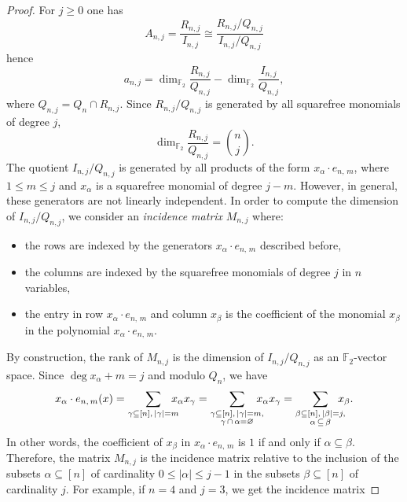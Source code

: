 \documentclass[11pt]{article}
\newcommand{\F}[0]{\mathbb{F}}
\newcommand{\es}[2]{e_{#1,\, #2}}
\theoremstyle{plain}
\theoremstyle{definition}
\theoremstyle{remark}
\begin{document}
\begin{proof}
For $j\geq 0$ one has
$$A_{n,j}=\frac{R_{n,j}}{I_{n,j}}\cong\frac{R_{n,j}/Q_{n,j}}{I_{n,j}/Q_{n,j}}$$ hence $$a_{n,j}=\operatorname{dim}_{\F_2}\frac{R_{n,j}}{Q_{n,j}} - \operatorname{dim}_{\F_2}\frac{I_{n,j}}{Q_{n,j}},$$
where $Q_{n,j}=Q_n\cap R_{n,j}$. Since $R_{n,j}/Q_{n,j}$ is generated by all squarefree monomials of degree $j$, 
    $$\operatorname{dim}_{\F_2}\frac{R_{n,j}}{Q_{n,j}}=\binom{n}{j}.$$
The quotient $I_{n,j}/Q_{n,j}$ is generated by all products of the form $x_\alpha\cdot\es{n}{m}$, where $1\leq m\leq j$ and $x_\alpha$ is a squarefree monomial of degree $j-m$. However, in general, these generators are not linearly independent. In order to compute the dimension of $I_{n,j}/Q_{n,j}$, we consider an \textit{incidence matrix} $M_{n,j}$ where:
\begin{itemize}
    \item the rows are indexed by the generators $x_\alpha\cdot\es{n}{m}$ described before,
    \item the columns are indexed by the squarefree monomials  of degree $j$ in $n$ variables,
    \item the entry in row $x_\alpha\cdot\es{n}{m}$ and column $x_\beta$ is the coefficient of the monomial $x_\beta$ in the polynomial $x_\alpha\cdot\es{n}{m}$.
\end{itemize}
By construction, the rank of $M_{n,j}$ is the dimension of $I_{n,j}/Q_{n,j}$ as an $\F_2$-vector space. Since $\operatorname{deg}x_\alpha +m=j$ and modulo $Q_n$, we have 
\begin{equation*}
    x_\alpha\cdot\es{n}{m}(x)
    =\sum_{\gamma\subseteq[n],\,|\gamma|=m}\hspace{-0.3cm}x_\alpha x_\gamma
    =\sum_{\substack{\gamma\subseteq[n],\,|\gamma|=m, \\ \gamma\,\cap\,\alpha=\varnothing}} \hspace{-0.3cm}x_\alpha x_\gamma
    =\sum_{\substack{\beta\subseteq[n],\,|\beta|=j, \\ \alpha\,\subseteq\,\beta}}\hspace{-0.3cm}x_\beta.
\end{equation*}
In other words, the coefficient of $x_\beta$ in $x_\alpha\cdot\es{n}{m}$ is $1$ if and only if $\alpha\subseteq\beta$. Therefore, the matrix $M_{n,j}$ is the incidence matrix relative to the inclusion of the subsets $\alpha\subseteq[n]$ of cardinality $0\leq|\alpha|\leq j-1$ in the subsets $\beta\subseteq[n]$ of cardinality $j$. For example, if $n=4$ and $j=3$, we get the incidence matrix

\end{proof}
\end{document}

